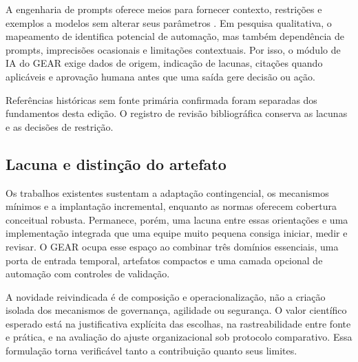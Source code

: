 A engenharia de prompts oferece meios para fornecer contexto, restrições e exemplos a modelos sem alterar seus parâmetros \citep{sahoo2025prompt}. Em pesquisa qualitativa, o mapeamento de \citet{barros2025qualitative} identifica potencial de automação, mas também dependência de prompts, imprecisões ocasionais e limitações contextuais. Por isso, o módulo de IA do GEAR exige dados de origem, indicação de lacunas, citações quando aplicáveis e aprovação humana antes que uma saída gere decisão ou ação.

Referências históricas sem fonte primária confirmada foram separadas dos fundamentos desta edição. O registro de revisão bibliográfica conserva as lacunas e as decisões de restrição.

\subsection{Lacuna e distinção do artefato}

Os trabalhos existentes sustentam a adaptação contingencial, os mecanismos mínimos e a implantação incremental, enquanto as normas oferecem cobertura conceitual robusta. Permanece, porém, uma lacuna entre essas orientações e uma implementação integrada que uma equipe muito pequena consiga iniciar, medir e revisar. O GEAR ocupa esse espaço ao combinar três domínios essenciais, uma porta de entrada temporal, artefatos compactos e uma camada opcional de automação com controles de validação.

A novidade reivindicada é de composição e operacionalização, não a criação isolada dos mecanismos de governança, agilidade ou segurança. O valor científico esperado está na justificativa explícita das escolhas, na rastreabilidade entre fonte e prática, e na avaliação do ajuste organizacional sob protocolo comparativo. Essa formulação torna verificável tanto a contribuição quanto seus limites.
